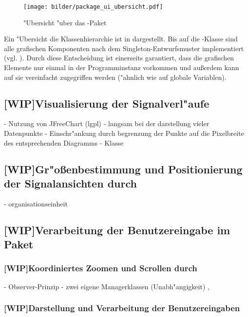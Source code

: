 \begin{figure}[htb]
\centering
\texttt{[image: bilder/package\_ui\_ubersicht.pdf]}
\caption{"Ubersicht "uber das -Paket}
\label{pic:package_ui_ubersicht}
\end{figure}

Ein "Ubersicht die Klassenhierarchie ist in  dargestellt.
Bis auf die -Klasse sind alle grafischen Komponenten nach dem Singleton-Entwurfsmuster implementiert (vgl. ).
Durch diese Entscheidung ist einerseits garantiert, dass die grafischen Elemente nur einmal in der Programminstanz vorkommen und au{\ss}erdem kann auf sie vereinfacht zugegriffen werden ("ahnlich wie auf globale Variablen).


\subsection{[WIP]Visualisierung der Signalverl"aufe}

- Nutzung von JFreeChart (\ac{lgpl})
- langsam bei der darstellung vieler Datenpunkte
- Einschr"ankung durch begrenzung der Punkte auf die Pixelbreite des entsprechenden Diagramms
- Klasse 

\subsection{[WIP]Gr"o{\ss}enbestimmung und Positionierung der Signalansichten durch }
\label{sec:signalpanel_organisation}

- organisationseinheit

\subsection{[WIP]Verarbeitung der Benutzereingabe im Paket }


\subsubsection{[WIP]Koordiniertes Zoomen und Scrollen durch }

- Observer-Prinzip
- zwei eigene Managerklassen (Unabh"angigkeit) , 

\subsubsection{[WIP]Darstellung und Verarbeitung der Benutzereingaben}

